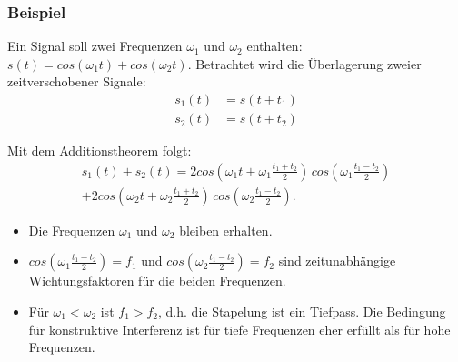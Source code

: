 \subsubsection*{Beispiel}
Ein Signal soll zwei Frequenzen $\omega_1$ und $\omega_2$ enthalten: $s(t) = cos(\omega_1t) + cos(\omega_2t)$. Betrachtet wird die Überlagerung zweier zeitverschobener Signale:
\begin{align*}
s_1(t) &=s(t+t_1)\\
s_2(t) &=s(t+t_2)
\end{align*}

Mit dem Additionstheorem folgt:
\begin{multline}
s_1(t)+s_2(t)= 2 cos\left(\omega_1 t +\omega_1\frac{t_1+t_2}{2}\right)\,cos\left(\omega_1\frac{t_1-t_2}{2}\right)\\
+2 cos\left(\omega_2 t +\omega_2\frac{t_1+t_2}{2}\right)\,cos\left(\omega_2\frac{t_1-t_2}{2}\right).
\end{multline}

\begin{itemize}
\item Die Frequenzen $\omega_1$ und $\omega_2$ bleiben erhalten.
\item $cos(\omega_1\frac{t_1-t_2}{2})=f_1$ und $cos(\omega_2\frac{t_1-t_2}{2})=f_2$ sind zeitunabhängige Wichtungsfaktoren für die beiden Frequenzen.
\item Für $\omega_1<\omega_2$ ist $f_1>f_2$, d.h. die Stapelung ist ein Tiefpass. Die Bedingung für konstruktive Interferenz ist für tiefe Frequenzen eher erfüllt als für hohe Frequenzen. 
\end{itemize}